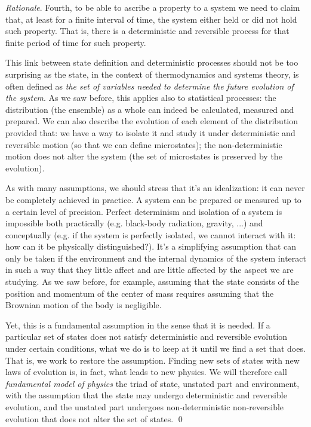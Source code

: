 \documentclass[aps,pra,10pt,twocolumn,floatfix,nofootinbib]{revtex4-1}
\theoremstyle{definition}
\newenvironment{rationale}{\emph{Rationale}.}{\qed}
\begin{document}
\begin{rationale}
Fourth, to be able to ascribe a property to a system we need to claim that, at least for a finite interval of time, the system either held or did not hold such property. That is, there is a deterministic and reversible process for that finite period of time for such property.

This link between state definition and deterministic processes should not be too surprising as the state, in the context of thermodynamics and systems theory, is often defined as \emph{the set of variables needed to determine the future evolution of the system}. As we saw before, this applies also to statistical processes: the distribution (the ensemble) as a whole can indeed be calculated, measured and prepared. We can also describe the evolution of each element of the distribution provided that: we have a way to isolate it and study it under deterministic and reversible motion (so that we can define microstates); the non-deterministic motion does not alter the system (the set of microstates is preserved by the evolution).

As with many assumptions, we should stress that it's an idealization: it can never be completely achieved in practice. A system can be prepared or measured up to a certain level of precision. Perfect determinism and isolation of a system is impossible both practically (e.g. black-body radiation, gravity, ...) and conceptually (e.g. if the system is perfectly isolated, we cannot interact with it: how can it be physically distinguished?). It's a simplifying assumption that can only be taken if the environment and the internal dynamics of the system interact in such a way that they little affect and are little affected by the aspect we are studying. As we saw before, for example, assuming that the state consists of the position and momentum of the center of mass requires assuming that the Brownian motion of the body is negligible.

Yet, this is a fundamental assumption in the sense that it is needed. If a particular set of states does not satisfy deterministic and reversible evolution under certain conditions, what we do is to keep at it until we find a set that does. That is, we work to restore the assumption. Finding new sets of states with new laws of evolution is, in fact, what leads to new physics. We will therefore call \emph{fundamental model of physics} the triad of state, unstated part and environment, with the assumption that the state may undergo deterministic and reversible evolution, and the unstated part undergoes non-deterministic non-reversible evolution that does not alter the set of states.
\end{rationale}
\end{document}
